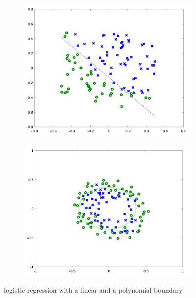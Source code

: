 \begin{figure}[H]
\centering
\begin{subfigure}{.5\textwidth}
  \centering
  \includegraphics[width=1.0\linewidth]{include/images/logistic_regression_linear_ex.png}
  \label{fig:log_reg_lin_ex}
\end{subfigure}%
\begin{subfigure}{.5\textwidth}
  \centering
  \includegraphics[width=1.0\linewidth]{include/images/logistic_regression_polynomial_ex.png}
  \label{fig:log_reg_pol_ex}
\end{subfigure}
\caption{logistic regression with a linear and a polynomial boundary}
\label{fig:log_reg_ex}
\end{figure}

